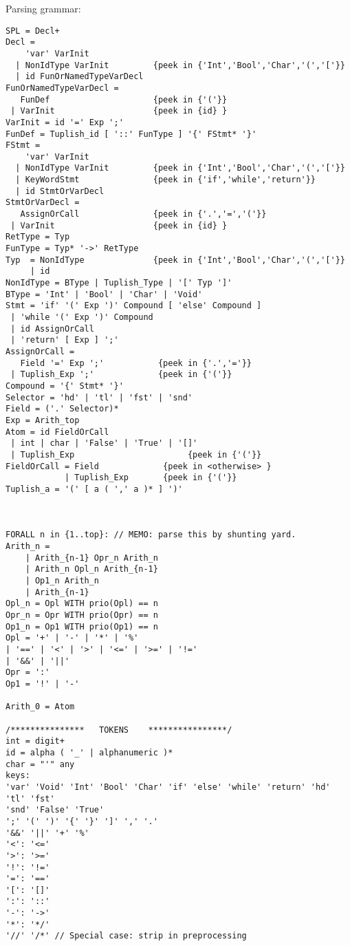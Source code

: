 \documentclass{report}
\begin{document}
Parsing grammar:
\begin{verbatim}
SPL = Decl+
Decl = 
    'var' VarInit
  | NonIdType VarInit         {peek in {'Int','Bool','Char','(','['}}
  | id FunOrNamedTypeVarDecl
FunOrNamedTypeVarDecl = 
   FunDef                     {peek in {'('}}
 | VarInit                    {peek in {id} }
VarInit = id '=' Exp ';'
FunDef = Tuplish_id [ '::' FunType ] '{' FStmt* '}'
FStmt = 
    'var' VarInit
  | NonIdType VarInit         {peek in {'Int','Bool','Char','(','['}}
  | KeyWordStmt               {peek in {'if','while','return'}}
  | id StmtOrVarDecl
StmtOrVarDecl = 
   AssignOrCall               {peek in {'.','=','('}}
 | VarInit                    {peek in {id} }
RetType = Typ
FunType = Typ* '->' RetType
Typ  = NonIdType              {peek in {'Int','Bool','Char','(','['}}
     | id
NonIdType = BType | Tuplish_Type | '[' Typ ']'
BType = 'Int' | 'Bool' | 'Char' | 'Void'
Stmt = 'if' '(' Exp ')' Compound [ 'else' Compound ]
 | 'while '(' Exp ')' Compound
 | id AssignOrCall
 | 'return' [ Exp ] ';'
AssignOrCall = 
   Field '=' Exp ';'           {peek in {'.','='}}
 | Tuplish_Exp ';'             {peek in {'('}}
Compound = '{' Stmt* '}'
Selector = 'hd' | 'tl' | 'fst' | 'snd'
Field = ('.' Selector)*
Exp = Arith_top
Atom = id FieldOrCall
 | int | char | 'False' | 'True' | '[]'
 | Tuplish_Exp                       {peek in {'('}}
FieldOrCall = Field             {peek in <otherwise> }
            | Tuplish_Exp       {peek in {'('}}
Tuplish_a = '(' [ a ( ',' a )* ] ')'



FORALL n in {1..top}: // MEMO: parse this by shunting yard.
Arith_n = 
    | Arith_{n-1} Opr_n Arith_n
    | Arith_n Opl_n Arith_{n-1}
    | Op1_n Arith_n
    | Arith_{n-1}
Opl_n = Opl WITH prio(Opl) == n
Opr_n = Opr WITH prio(Opr) == n
Op1_n = Op1 WITH prio(Op1) == n
Opl = '+' | '-' | '*' | '%'
| '==' | '<' | '>' | '<=' | '>=' | '!='
| '&&' | '||'
Opr = ':'
Op1 = '!' | '-'

Arith_0 = Atom

/***************   TOKENS    ****************/
int = digit+
id = alpha ( '_' | alphanumeric )*
char = "'" any
keys:
'var' 'Void' 'Int' 'Bool' 'Char' 'if' 'else' 'while' 'return' 'hd' 'tl' 'fst'
'snd' 'False' 'True' 
';' '(' ')' '{' '}' ']' ',' '.' 
'&&' '||' '+' '%' 
'<': '<='
'>': '>='
'!': '!='
'=': '=='
'[': '[]'
':': '::'
'-': '->'
'*': '*/'
'//' '/*' // Special case: strip in preprocessing
\end{verbatim}
\end{document}
